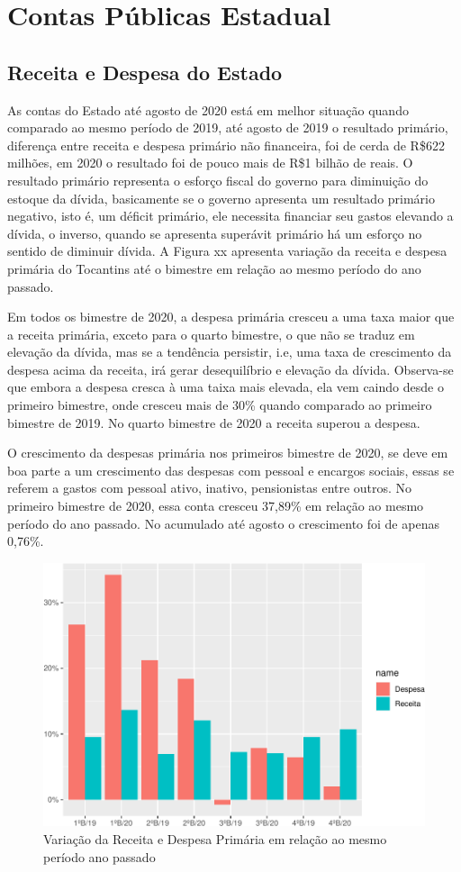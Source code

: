 \chapter{Contas Públicas Estadual}
\section{Receita e Despesa do
Estado}
As contas do Estado até agosto de 2020 está em melhor situação quando
comparado ao mesmo período de 2019, até agosto de 2019 o resultado
primário, diferença entre receita e despesa primário não financeira, foi
de cerda de R\$622 milhões, em 2020 o resultado foi de pouco mais de
R\$1 bilhão de reais. O resultado primário representa o esforço fiscal
do governo para diminuição do estoque da dívida, basicamente se o
governo apresenta um resultado primário negativo, isto é, um déficit
primário, ele necessita financiar seu gastos elevando a dívida, o
inverso, quando se apresenta superávit primário há um esforço no sentido
de diminuir dívida. A Figura xx apresenta variação da receita e despesa
primária do Tocantins até o bimestre em relação ao mesmo período do ano
passado.

Em todos os bimestre de 2020, a despesa primária cresceu a uma taxa
maior que a receita primária, exceto para o quarto bimestre, o que não
se traduz em elevação da dívida, mas se a tendência persistir, i.e, uma
taxa de crescimento da despesa acima da receita, irá gerar desequilíbrio
e elevação da dívida. Observa-se que embora a despesa cresca à uma taixa
mais elevada, ela vem caindo desde o primeiro bimestre, onde cresceu
mais de 30\% quando comparado ao primeiro bimestre de 2019. No quarto
bimestre de 2020 a receita superou a despesa.

O crescimento da despesas primária nos primeiros bimestre de 2020, se
deve em boa parte a um crescimento das despesas com pessoal e encargos
sociais, essas se referem a gastos com pessoal ativo, inativo,
pensionistas entre outros. No primeiro bimestre de 2020, essa conta
cresceu 37,89\% em relação ao mesmo período do ano passado. No acumulado
até agosto o crescimento foi de apenas 0,76\%.

\begin{figure}[h]
\caption{Variação da Receita e Despesa Primária em relação ao mesmo período ano passado}
\includegraphics[width=\linewidth]{fig/unnamed-chunk-4-1.pdf}
\end{figure}

